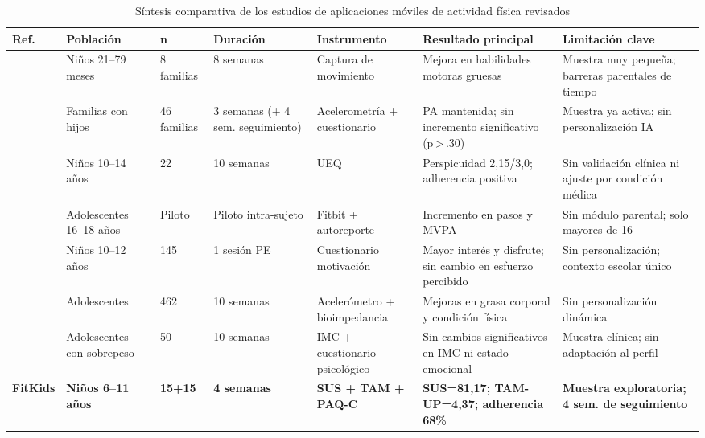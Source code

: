 				\begin{table}[H]
					\centering
					\small
					\caption[Síntesis de los estudios de aplicaciones móviles de actividad física]{Síntesis comparativa de los estudios de aplicaciones móviles de actividad física revisados}
					\label{tab:comparativa_estudios}
					\begin{tabular}{p{0.75cm}p{2.0cm}p{1.2cm}p{1.8cm}p{2.1cm}p{2.9cm}p{2.7cm}}
						\hline
						\textbf{Ref.} & \textbf{Población} & \textbf{n} & \textbf{Duración} & \textbf{Instrumento} & \textbf{Resultado principal} & \textbf{Limitación clave} \\
						\hline
						\cite{Zhang2024} & Niños 21--79 meses & 8 familias & 8 semanas & Captura de movimiento & Mejora en habilidades motoras gruesas & Muestra muy pequeña; barreras parentales de tiempo \\
						
						\cite{Wunsch2024} & Familias con hijos & 46 familias & 3 semanas (+ 4 sem. seguimiento) & Acelerometría + cuestionario & PA mantenida; sin incremento significativo (p\,>\,.30) & Muestra ya activa; sin personalización IA \\
						
						\cite{Willinger2024} & Niños 10--14 años & 22 & 10 semanas & UEQ & Perspicuidad 2,15/3,0; adherencia positiva & Sin validación clínica ni ajuste por condición médica \\
						
						\cite{Domin2022} & Adolescentes 16--18 años & Piloto & Piloto intra-sujeto & Fitbit + autoreporte & Incremento en pasos y MVPA & Sin módulo parental; solo mayores de 16 \\
						
						\cite{Papastergiou2021} & Niños 10--12 años & 145 & 1 sesión PE & Cuestionario motivación & Mayor interés y disfrute; sin cambio en esfuerzo percibido & Sin personalización; contexto escolar único \\
						
						\cite{GomezCuesta2024} & Adolescentes & 462 & 10 semanas & Acelerómetro + bioimpedancia & Mejoras en grasa corporal y condición física & Sin personalización dinámica \\
						
						\cite{MateoOrcajada2024} & Adolescentes con sobrepeso & 50 & 10 semanas & IMC + cuestionario psicológico & Sin cambios significativos en IMC ni estado emocional & Muestra clínica; sin adaptación al perfil \\
						
						\textbf{FitKids} & \textbf{Niños 6--11 años} & \textbf{15+15} & \textbf{4 semanas} & \textbf{SUS + TAM + PAQ-C} & \textbf{SUS=81,17; TAM-UP=4,37; adherencia 68\%} & \textbf{Muestra exploratoria; 4 sem. de seguimiento} \\
						\hline
					\end{tabular}
				\end{table}
				\tblnote
				
